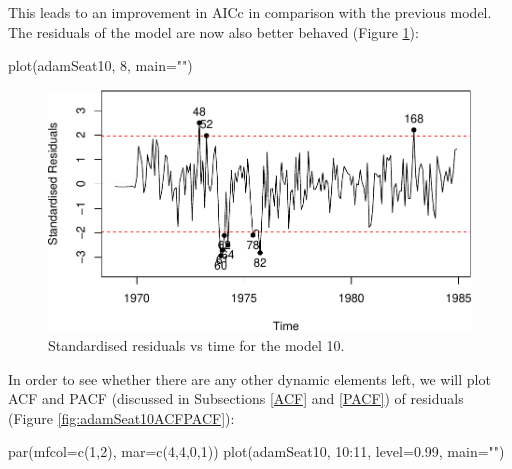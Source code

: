 \documentclass[
]{book}
\newenvironment{Shaded}{\begin{snugshade}}{\end{snugshade}}
\newcommand{\AttributeTok}[1]{\textcolor[rgb]{0.77,0.63,0.00}{#1}}
\newcommand{\DecValTok}[1]{\textcolor[rgb]{0.00,0.00,0.81}{#1}}
\newcommand{\FloatTok}[1]{\textcolor[rgb]{0.00,0.00,0.81}{#1}}
\newcommand{\FunctionTok}[1]{\textcolor[rgb]{0.00,0.00,0.00}{#1}}
\newcommand{\NormalTok}[1]{#1}
\newcommand{\SpecialCharTok}[1]{\textcolor[rgb]{0.00,0.00,0.00}{#1}}
\newcommand{\StringTok}[1]{\textcolor[rgb]{0.31,0.60,0.02}{#1}}
\theoremstyle{definition}
\theoremstyle{definition}
\theoremstyle{definition}
\theoremstyle{definition}
\theoremstyle{remark}
\begin{document}
This leads to an improvement in AICc in comparison with the previous model. The residuals of the model are now also better behaved (Figure \ref{fig:adamSeat10ResidvsTime}):

\begin{Shaded}
\begin{Highlighting}[]
\FunctionTok{plot}\NormalTok{(adamSeat10, }\DecValTok{8}\NormalTok{, }\AttributeTok{main=}\StringTok{""}\NormalTok{)}
\end{Highlighting}
\end{Shaded}

\begin{figure}
\centering
\includegraphics{Svetunkov--2022----ADAM_files/figure-latex/adamSeat10ResidvsTime-1.pdf}
\caption{\label{fig:adamSeat10ResidvsTime}Standardised residuals vs time for the model 10.}
\end{figure}

In order to see whether there are any other dynamic elements left, we will plot ACF and PACF (discussed in Subsections \ref{ACF} and \ref{PACF}) of residuals (Figure \ref{fig:adamSeat10ACFPACF}):

\begin{Shaded}
\begin{Highlighting}[]
\FunctionTok{par}\NormalTok{(}\AttributeTok{mfcol=}\FunctionTok{c}\NormalTok{(}\DecValTok{1}\NormalTok{,}\DecValTok{2}\NormalTok{), }\AttributeTok{mar=}\FunctionTok{c}\NormalTok{(}\DecValTok{4}\NormalTok{,}\DecValTok{4}\NormalTok{,}\DecValTok{0}\NormalTok{,}\DecValTok{1}\NormalTok{))}
\FunctionTok{plot}\NormalTok{(adamSeat10, }\DecValTok{10}\SpecialCharTok{:}\DecValTok{11}\NormalTok{, }\AttributeTok{level=}\FloatTok{0.99}\NormalTok{, }\AttributeTok{main=}\StringTok{""}\NormalTok{)}
\end{Highlighting}
\end{Shaded}
\end{document}
